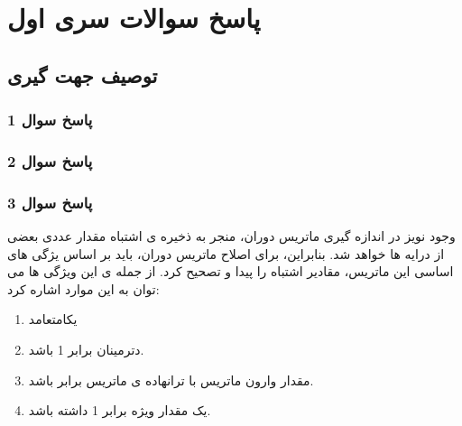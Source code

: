
\chapter{پاسخ سوالات سری اول}

\section{توصیف جهت گیری}

\subsection{ پاسخ سوال 1}

\subsection{ پاسخ سوال 2}

\subsection{ پاسخ سوال 3}
وجود نویز در اندازه گیری ماتریس دوران، منجر به ذخیره ی اشتباه مقدار عددی بعضی از درایه ها خواهد شد. بنابراین، برای اصلاح ماتریس دوران، باید بر اساس یژگی های اساسی این ماتریس، مقادیر اشتباه را پیدا و تصحیح کرد. از جمله ی این ویژگی ها می توان به این موارد اشاره کرد:

\begin{enumerate}
	\item یکامتعامد
	\item دترمینان برابر 1 باشد.
	\item مقدار وارون ماتریس با ترانهاده ی ماتریس برابر باشد.
	\item یک مقدار ویژه برابر 1 داشته باشد.
\end{enumerate}

